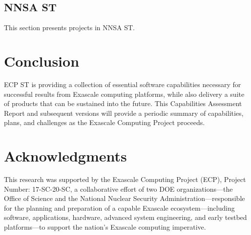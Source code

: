 \documentclass{ecpreport-publicv1}
\newcommand{\nnsa}{NNSA ST}
\begin{document}
\subsection{\nnsa}
This section presents projects in \nnsa.
\newpage




\newpage






\newpage

\newpage

\section{Conclusion}

ECP ST is providing a collection of essential software capabilities necessary for successful results from Exascale computing platforms, while also delivery a suite of products that can be sustained into the future.  This Capabilities Assessment Report and subsequent versions will provide a periodic summary of capabilities, plans, and challenges as the Exascale Computing Project proceeds.
\newpage
\section*{Acknowledgments}

This research was supported by the Exascale Computing Project (ECP), Project
Number: 17-SC-20-SC, a collaborative effort of two DOE organizations---the
Office of Science and the National Nuclear Security
Administration---responsible for the planning and preparation of a capable
Exascale ecosystem---including software, applications, hardware, advanced
system engineering, and early testbed platforms---to support the nation's
Exascale computing imperative.
\end{document}
